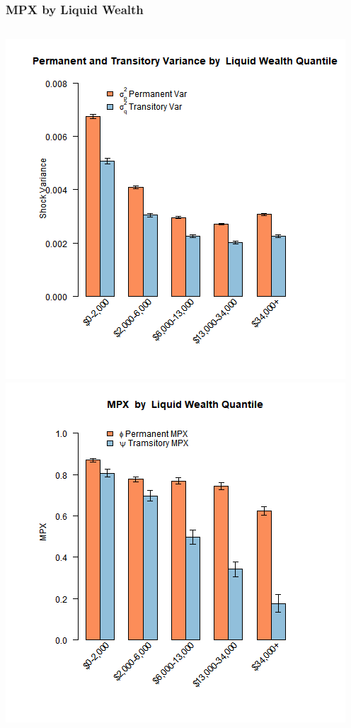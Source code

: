 \documentclass{beamer}
\begin{document}
{
	\frametitle{MPX by Liquid Wealth}
	\begin{columns}
		\centering
		\includegraphics[scale=0.35]{../Figures/VarianceByLiquidWealth_level_lincome_head.png}
		\centering
		\includegraphics[scale=0.35]{../Figures/MPXByLiquidWealth_level_lincome_head.png}
	\end{columns} 	
}
\end{document}
